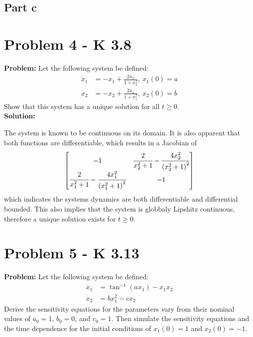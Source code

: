 \documentclass[letter]{article}
\begin{document}
\subsection{Part c}










\newpage
\section{Problem 4 - K 3.8}
\textbf{Problem:}
Let the following system be defined:
\begin{equation}
	\begin{aligned}
		\dot{x}_1 &= -x_1 + \frac{2 x_2}{1 + x_2^2}, \ x_1(0) = a\\
		\dot{x}_2 &= -x_2 + \frac{2 x_1}{1 + x_1^2}, \ x_2(0) = b
	\end{aligned}
\end{equation}
Show that this system has a unique solution for all $t \geq 0$.\\

\noindent
\textbf{Solution:}

The system is known to be continuous on its domain. It is also apparent that both functions are differentiable, which results in a Jacobian of
\begin{equation}
	\mqty[-1		& \cfrac{2}{x_2^2 + 1} - \cfrac{4 x_2^2}{\qty(x_2^2 + 1)^2}\\
		  \cfrac{2}{x_1^2 + 1} - \cfrac{4 x_1^2}{\qty(x_1^2 + 1)^2} & -1]
\end{equation}
which indicates the systems dynamics are both differentiable and differential bounded. This also implies that the system is globbaly Lipshitz continuous, therefore a unique solution exists for $t\geq 0$.

\newpage
\section{Problem 5 - K 3.13}
\textbf{Problem:}
Let the following system be defined:
\begin{equation}
	\begin{aligned}
		\dot{x}_1 &= \tan^{-1}(ax_1) - x_1 x_2\\
		\dot{x}_2 &= b x_1^2 - c x_2
	\end{aligned}
\end{equation}
Derive the sensitivity equations for the parameters vary from their nominal values of $a_0 = 1$, $b_0 = 0$, and $c_0 = 1$. Then simulate the sensitivity equations and the time dependence for the initial conditions of $x_1(0) = 1$ and $x_2(0) = -1$.\\
\end{document}
